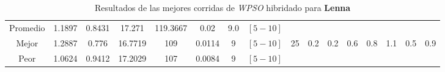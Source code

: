 \begin{table}[h!]
\begin{center}
\begin{tabular}{|c|c|c|c|c|c|c|c|c|c|c|c|c|c|c|c|}
        \hline
        \hline
            Promedio  & 1.1897 & 0.8431 & 17.271 & 119.3667 & 0.02 & 9.0 & $[5-10]$ &  &  &  &  &  &  &  & \\
            \cline{1-8}
            Mejor & 1.2887 & 0.776  & 16.7719 & 109 & 0.0114 & 9 & $[5-10]$ & 25 & 0.2 & 0.2 & 0.6 & 0.8 & 1.1 & 0.5 & 0.9\\
            \cline{1-8}
            Peor & 1.0624 & 0.9412  & 17.2029 & 107 & 0.0084 & 9 & $[5-10]$ &  &  &  &  &  &  &  & \\
        \hline
        \end{tabular}
        \caption{Resultados de las mejores corridas de \emph{WPSO} hibridado para {\bf Lenna}}
        \label{tb:tablewpsohibimg}
    \end{center}
\end{table}


